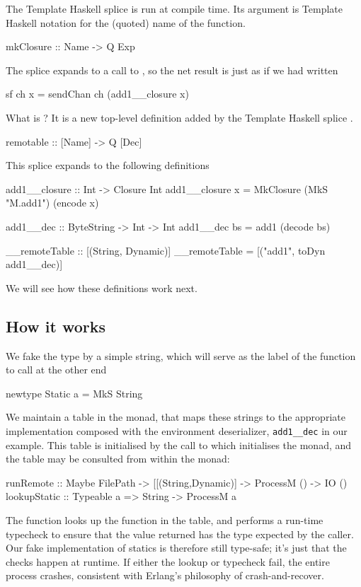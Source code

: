 \documentclass[preprint]{sigplanconf}
\begin{document}
The Template Haskell splice 
is run at compile time.  Its argument  is Template Haskell notation
for the (quoted) name of the  function.
\begin{code}
  mkClosure :: Name -> Q Exp
\end{code}
The splice expands to a call to , 
so the net result is just as if we had written
\begin{code}
  sf ch x = sendChan ch (add1__closure x)
\end{code}
What is ?  It is a new top-level definition
added by the Template Haskell splice .
\begin{code}
  remotable :: [Name] -> Q [Dec]
\end{code}
This splice expands to the following definitions
\begin{code}
  add1__closure :: Int -> Closure Int
  add1__closure x = MkClosure (MkS "M.add1") (encode x)

  add1__dec :: ByteString -> Int -> Int
  add1__dec bs = add1 (decode bs)

  __remoteTable :: [(String, Dynamic)]
  __remoteTable = [("add1", toDyn add1__dec)]
\end{code}
We will see how these definitions work next.

\subsection{How it works}

We fake the  type by a simple string, which will serve as the 
label of the function to call at the other end
\begin{code}
  newtype Static a = MkS String
\end{code}
We maintain a table in the  monad, that maps these strings
to the appropriate implementation composed with the environment deserializer,
\texttt{add1\_\_dec} in our example.
This table is initialised by the call to  which initialises the
 monad, and the table may be consulted from within the monad:
\begin{code}
  runRemote    :: Maybe FilePath
               -> [[(String,Dynamic)]
               -> ProcessM () -> IO ()
  lookupStatic :: Typeable a => String -> ProcessM a
\end{code}
The  function looks up the function in the table,
and performs a run-time typecheck to ensure that the value returned
has the type expected by the caller.  Our fake implementation of
statics is therefore still type-safe; it's just that the checks happen
at runtime.  If either the lookup or typecheck fail, the entire 
process crashes, consistent with Erlang's philosophy of crash-and-recover.
\end{document}
